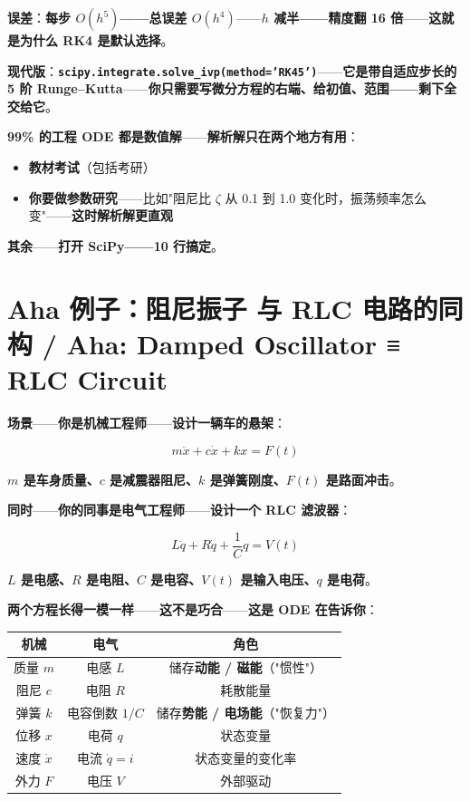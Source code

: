 \textbf{误差}：\textbf{每步 $O(h^5)$——总误差 $O(h^4)$}——\textbf{$h$ 减半——精度翻 16 倍}——\textbf{这就是为什么 RK4 是默认选择}。

\textbf{现代版}：\textbf{\texttt{scipy.integrate.solve\_ivp(method='RK45')}}——\textbf{它是带自适应步长的 5 阶 Runge--Kutta}——\textbf{你只需要写微分方程的右端、给初值、范围——剩下全交给它}。

\begin{remark}[工业现实]
\textbf{99\% 的工程 ODE 都是数值解}——\textbf{解析解只在两个地方有用}：
\begin{itemize}
\item \textbf{教材考试}（包括考研）
\item \textbf{你要做\textbf{参数研究}}——比如"阻尼比 $\zeta$ 从 0.1 到 1.0 变化时，振荡频率怎么变"——\textbf{这时解析解更直观}
\end{itemize}
\textbf{其余}——\textbf{打开 SciPy——10 行搞定}。
\end{remark}

\section{Aha 例子：阻尼振子 与 RLC 电路的同构 / Aha: Damped Oscillator ≡ RLC Circuit}

\textbf{场景}——\textbf{你是机械工程师}——\textbf{设计一辆车的悬架}：

\[
m \ddot{x} + c \dot{x} + k x = F(t)
\]

\textbf{$m$ 是车身质量、$c$ 是减震器阻尼、$k$ 是弹簧刚度、$F(t)$ 是路面冲击}。

\medskip

\textbf{同时}——\textbf{你的同事是电气工程师}——\textbf{设计一个 RLC 滤波器}：

\[
L \ddot{q} + R \dot{q} + \frac{1}{C} q = V(t)
\]

\textbf{$L$ 是电感、$R$ 是电阻、$C$ 是电容、$V(t)$ 是输入电压、$q$ 是电荷}。

\medskip

\textbf{两个方程长得一模一样}——\textbf{这不是巧合}——\textbf{这是 ODE 在告诉你}：

\medskip

\begin{center}
\begin{tabular}{ccc}
\toprule
\textbf{机械} & \textbf{电气} & \textbf{角色} \\
\midrule
质量 $m$ & 电感 $L$ & 储存\textbf{动能 / 磁能}（"惯性"） \\
阻尼 $c$ & 电阻 $R$ & 耗散能量 \\
弹簧 $k$ & 电容倒数 $1/C$ & 储存\textbf{势能 / 电场能}（"恢复力"） \\
位移 $x$ & 电荷 $q$ & 状态变量 \\
速度 $\dot x$ & 电流 $\dot q = i$ & 状态变量的变化率 \\
外力 $F$ & 电压 $V$ & 外部驱动 \\
\bottomrule
\end{tabular}
\end{center}

